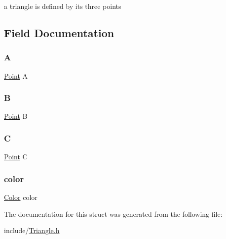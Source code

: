 a triangle is defined by its three points 

\subsection{Field Documentation}
\mbox{\label{struct_triangle_a52df86c0a1979613c6b8ee0f785ba181}} 
\subsubsection{\texorpdfstring{A}{A}}
{\footnotesize\ttfamily \hyperlink{struct_point}{Point} A}

\mbox{\label{struct_triangle_a42d857842a35fc7c3bfda0922ddcdd70}} 
\subsubsection{\texorpdfstring{B}{B}}
{\footnotesize\ttfamily \hyperlink{struct_point}{Point} B}

\mbox{\label{struct_triangle_a3d8ff0c539667710e4db6c73b03dbc63}} 
\subsubsection{\texorpdfstring{C}{C}}
{\footnotesize\ttfamily \hyperlink{struct_point}{Point} C}

\mbox{\label{struct_triangle_aa5f4d1eda21c196bd8401ff73f105073}} 
\subsubsection{\texorpdfstring{color}{color}}
{\footnotesize\ttfamily \hyperlink{struct_color}{Color} color}



The documentation for this struct was generated from the following file\+:\begin{DoxyCompactItemize}
\item 
include/\hyperlink{_triangle_8h}{Triangle.\+h}\end{DoxyCompactItemize}
